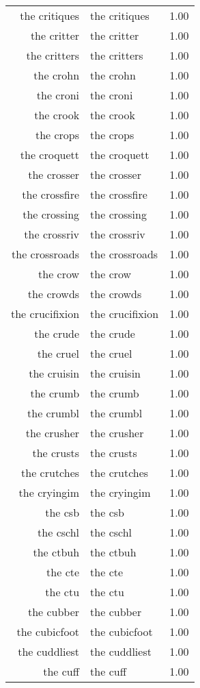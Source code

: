 \begin{table}[ht]
\begin{tabular}{rlr}
  the critiques & the critiques & 1.00 \\ 
  the critter & the critter & 1.00 \\ 
  the critters & the critters & 1.00 \\ 
  the crohn & the crohn & 1.00 \\ 
  the croni & the croni & 1.00 \\ 
  the crook & the crook & 1.00 \\ 
  the crops & the crops & 1.00 \\ 
  the croquett & the croquett & 1.00 \\ 
  the crosser & the crosser & 1.00 \\ 
  the crossfire & the crossfire & 1.00 \\ 
  the crossing & the crossing & 1.00 \\ 
  the crossriv & the crossriv & 1.00 \\ 
  the crossroads & the crossroads & 1.00 \\ 
  the crow & the crow & 1.00 \\ 
  the crowds & the crowds & 1.00 \\ 
  the crucifixion & the crucifixion & 1.00 \\ 
  the crude & the crude & 1.00 \\ 
  the cruel & the cruel & 1.00 \\ 
  the cruisin & the cruisin & 1.00 \\ 
  the crumb & the crumb & 1.00 \\ 
  the crumbl & the crumbl & 1.00 \\ 
  the crusher & the crusher & 1.00 \\ 
  the crusts & the crusts & 1.00 \\ 
  the crutches & the crutches & 1.00 \\ 
  the cryingim & the cryingim & 1.00 \\ 
  the csb & the csb & 1.00 \\ 
  the cschl & the cschl & 1.00 \\ 
  the ctbuh & the ctbuh & 1.00 \\ 
  the cte & the cte & 1.00 \\ 
  the ctu & the ctu & 1.00 \\ 
  the cubber & the cubber & 1.00 \\ 
  the cubicfoot & the cubicfoot & 1.00 \\ 
  the cuddliest & the cuddliest & 1.00 \\ 
  the cuff & the cuff & 1.00 \\ 

\end{tabular}
\end{table}
